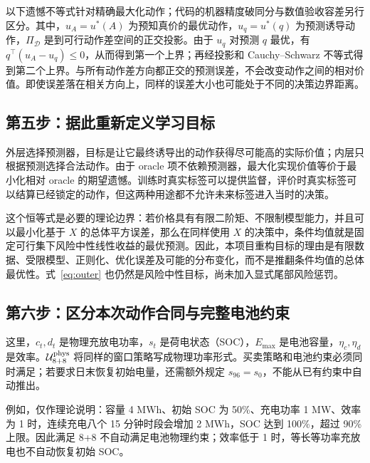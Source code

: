\documentclass[11pt,a4paper]{article}
\begin{document}
\EqRegret
以下遗憾不等式针对精确最大化动作；代码的机器精度破同分与数值验收容差另行区分。其中，$u_A=u^*(A)$ 为预知真价的最优动作，$u_q=u^*(q)$ 为预测诱导动作，$\Pi_{\mathcal D}$ 是到可行动作差空间的正交投影。由于 $u_q$ 对预测 $q$ 最优，有 $q^\top(u_A-u_q)\le0$，从而得到第一个上界；再经投影和 Cauchy--Schwarz 不等式得到第二个上界。与所有动作差方向都正交的预测误差，不会改变动作之间的相对价值。即使误差落在相关方向上，同样的误差大小也可能处于不同的决策边界距离。

\subsection{第五步：据此重新定义学习目标}
\EqOuter
外层选择预测器，目标是让它最终诱导出的动作获得尽可能高的实际价值；内层只根据预测选择合法动作。由于 oracle 项不依赖预测器，最大化实现价值等价于最小化相对 oracle 的期望遗憾。训练时真实标签可以提供监督，评价时真实标签可以结算已经锁定的动作，但这两种用途都不允许未来标签进入当时的决策。

\EqBayes
这个恒等式是必要的理论边界：若价格具有有限二阶矩、不限制模型能力，并且可以最小化基于 $X$ 的总体平方误差，那么在同样使用 $X$ 的决策中，条件均值就是固定可行集下风险中性线性收益的最优预测。因此，本项目重构目标的理由是有限数据、受限模型、正则化、优化误差及可能的分布变化，而不是推翻条件均值的总体最优性。式~\eqref{eq:outer} 也仍然是风险中性目标，尚未加入显式尾部风险惩罚。

\subsection{第六步：区分本次动作合同与完整电池约束}
\EqPhysical
这里，$c_t,d_t$ 是物理充放电功率，$s_t$ 是荷电状态（SOC），$E_{\max}$ 是电池容量，$\eta_c,\eta_d$ 是效率。$\mathcal U_{8+8}^{\rm phys}$ 将同样的窗口策略写成物理功率形式。买卖策略和电池约束必须同时满足；若要求日末恢复初始电量，还需额外规定 $s_{96}=s_0$，不能从已有约束中自动推出。

例如，仅作理论说明：容量 4 MWh、初始 SOC 为 50\%、充电功率 1 MW、效率为 1 时，连续充电八个 15 分钟时段会增加 2 MWh，SOC 达到 100\%，超过 90\% 上限。因此满足 8+8 不自动满足电池物理约束；效率低于 1 时，等长等功率充放电也不自动恢复初始 SOC。
\end{document}
